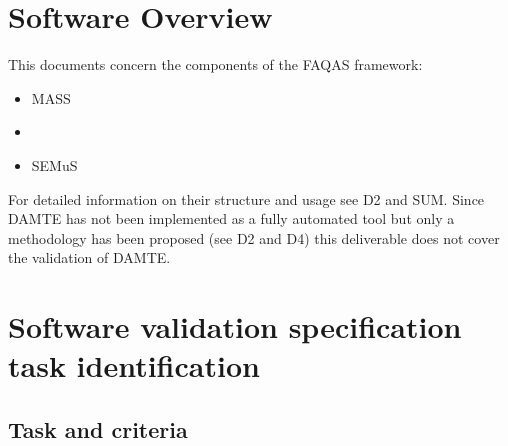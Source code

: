 \chapter{Software Overview}

This documents concern the components of the FAQAS framework:
\begin{itemize}
  \item MASS
  \item \DAMA
  \item SEMuS
\end{itemize}

For detailed information on their structure and usage see D2 and SUM. Since DAMTE has not been implemented as a fully automated tool but only a methodology has been proposed (see D2 and D4) this deliverable does not cover the validation of DAMTE.

\chapter{Software validation specification task identification}

\STARTCHANGEDFINAL

\section{Task and criteria}
\label{sec:taskCrit}

